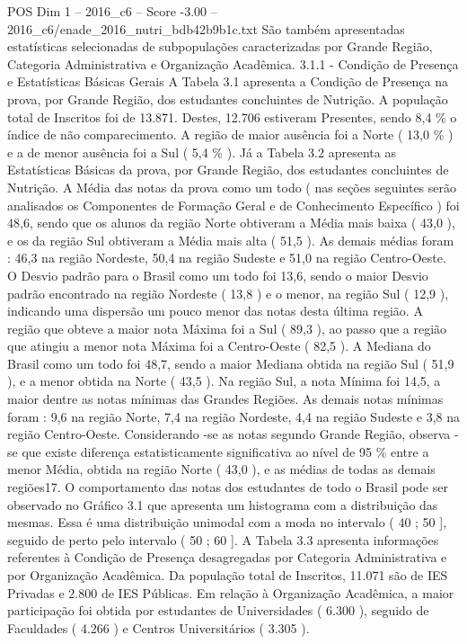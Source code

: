 \begin{textsample}{POS Dim 1 – 2016\_c6 – Score -3.00 – 2016\_c6/enade\_2016\_nutri\_bdb42b9b1c.txt}
São também apresentadas estatísticas selecionadas de subpopulações caracterizadas por Grande Região, Categoria Administrativa e Organização Acadêmica. 3.1.1 - Condição de Presença e Estatísticas Básicas Gerais A Tabela 3.1 apresenta a Condição de Presença na prova, por Grande Região, dos estudantes concluintes de Nutrição.
A população total de Inscritos foi de 13.871.
Destes, 12.706 estiveram Presentes, sendo 8,4 \% o índice de não comparecimento.
A região de maior ausência foi a Norte ( 13,0 \% ) e a de menor ausência foi a Sul ( 5,4 \% ).
Já a Tabela 3.2 apresenta as Estatísticas Básicas da prova, por Grande Região, dos estudantes concluintes de Nutrição.
A Média das notas da prova como um todo ( nas seções seguintes serão analisados os Componentes de Formação Geral e de Conhecimento Específico ) foi 48,6, sendo que os alunos da região Norte obtiveram a Média mais baixa ( 43,0 ), e os da região Sul obtiveram a Média mais alta ( 51,5 ).
As demais médias foram : 46,3 na região Nordeste, 50,4 na região Sudeste e 51,0 na região Centro-Oeste.
O Desvio padrão para o Brasil como um todo foi 13,6, sendo o maior Desvio padrão encontrado na região Nordeste ( 13,8 ) e o menor, na região Sul ( 12,9 ), indicando uma dispersão um pouco menor das notas desta última região.
A região que obteve a maior nota Máxima foi a Sul ( 89,3 ), ao passo que a região que atingiu a menor nota Máxima foi a Centro-Oeste ( 82,5 ).
A Mediana do Brasil como um todo foi 48,7, sendo a maior Mediana obtida na região Sul ( 51,9 ), e a menor obtida na Norte ( 43,5 ).
Na região Sul, a nota Mínima foi 14,5, a maior dentre as notas mínimas das Grandes Regiões.
As demais notas mínimas foram : 9,6 na região Norte, 7,4 na região Nordeste, 4,4 na região Sudeste e 3,8 na região Centro-Oeste.
Considerando -se as notas segundo Grande Região, observa -se que existe diferença estatisticamente significativa ao nível de 95 \% entre a menor Média, obtida na região Norte ( 43,0 ), e as médias de todas as demais regiões17.
O comportamento das notas dos estudantes de todo o Brasil pode ser observado no Gráfico 3.1 que apresenta um histograma com a distribuição das mesmas.
Essa é uma distribuição unimodal com a moda no intervalo ( 40 ; 50 ], seguido de perto pelo intervalo ( 50 ; 60 ].
A Tabela 3.3 apresenta informações referentes à Condição de Presença desagregadas por Categoria Administrativa e por Organização Acadêmica.
Da população total de Inscritos, 11.071 são de IES Privadas e 2.800 de IES Públicas.
Em relação à Organização Acadêmica, a maior participação foi obtida por estudantes de Universidades ( 6.300 ), seguido de Faculdades ( 4.266 ) e Centros Universitários ( 3.305 ).

\end{textsample}
